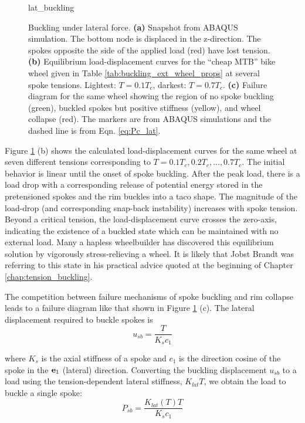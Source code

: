 \documentclass[\rootdir/thesis.tex]{subfiles}
\begin{document}
\begin{figure}
\centering
{lat_buckling} 
\caption{Buckling under lateral force. \textbf{(a)} Snapshot from ABAQUS simulation. The bottom node is displaced in the z-direction. The spokes opposite the side of the applied load (red) have lost tension. \textbf{(b)} Equilibrium load-displacement curves for the ``cheap MTB'' bike wheel given in Table \ref{tab:buckling_ext_wheel_props} at several spoke tensions. Lightest: $T=0.1T_c$, darkest: $T=0.7T_c$. \textbf{(c)} Failure diagram for the same wheel showing the region of no spoke buckling (green), buckled spokes but positive stiffness (yellow), and wheel collapse (red). The markers are from ABAQUS simulations and the dashed line is from Eqn. \eqref{eq:Pc_lat}.}
\label{fig:lat_buckling}
\end{figure}

Figure \ref{fig:lat_buckling} (b) shows the calculated load-displacement curves for the same wheel at seven different tensions corresponding to $T=0.1T_c, 0.2T_c,...,0.7T_c$. The initial behavior is linear until the onset of spoke buckling. After the peak load, there is a load drop with a corresponding release of potential energy stored in the pretensioned spokes and the rim buckles into a taco shape. The magnitude of the load-drop (and corresponding snap-back instability) increases with spoke tension. Beyond a critical tension, the load-displacement curve crosses the zero-axis, indicating the existence of a buckled state which can be maintained with no external load. Many a hapless wheelbuilder has discovered this equilibrium solution by vigorously stress-relieving a wheel. It is likely that Jobst Brandt was referring to this state in his practical advice quoted at the beginning of Chapter \ref{chap:tension_buckling}.

The competition between failure mechanisms of spoke buckling and rim collapse leads to a failure diagram like that shown in Figure \ref{fig:lat_buckling} (c). The lateral displacement required to buckle spokes is
\begin{equation}
u_{sb} = \frac{T}{K_s c_1}
\end{equation}

where $K_s$ is the axial stiffness of a spoke and $c_1$ is the direction cosine of the spoke in the $\mathbf{e}_1$ (lateral) direction. Converting the buckling displacement $u_{sb}$ to a load using the tension-dependent lateral stiffness, $K_{lat}{T}$, we obtain the load to buckle a single spoke:
\begin{equation}
\label{eq:Pc_lat}
P_{sb} = \frac{K_{lat}(T) T}{K_s c_1}
\end{equation}
\end{document}
